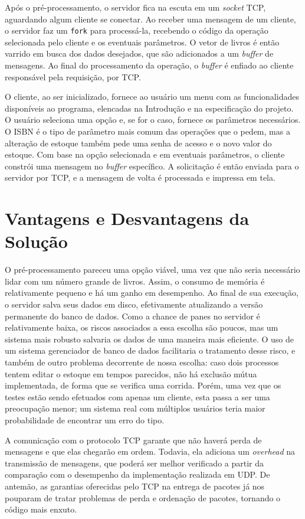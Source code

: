 \documentclass[11pt, brazil]{article} %
\begin{document}
Após o pré-processamento, o servidor fica na escuta em um \emph{socket} TCP, aguardando algum cliente se conectar. 
Ao receber uma mensagem de um cliente, o servidor faz um \texttt{fork} para processá-la, recebendo o código da operação selecionada pelo cliente e os eventuais parâmetros.
O vetor de livros é então varrido em busca dos dados desejados, que são adicionados a um \emph{buffer} de mensagens.
Ao final do processamento da operação, o \emph{buffer} é enfiado ao cliente responsável pela requisição, por TCP.

O cliente, ao ser inicializado, fornece ao usuário um menu com as funcionalidades disponíveis ao programa, elencadas na Introdução e na especificação do projeto. 
O usuário seleciona uma opção e, se for o caso, fornece os parâmetros necessários.
O ISBN é o tipo de parâmetro mais comum das operações que o pedem, mas a alteração de estoque também pede uma senha de acesso e o novo valor do estoque. 
Com base na opção selecionada e em eventuais parâmetros, o cliente constrói uma mensagem no \emph{buffer} específico. 
A solicitação é então enviada para o servidor por TCP, e a mensagem de volta é processada e impressa em tela.



\section{Vantagens e Desvantagens da Solução}

O pré-processamento pareceu uma opção viável, uma vez que não seria necessário lidar com um número grande de livros. Assim, o consumo de memória é relativamente pequeno e há um ganho em desempenho. 
Ao final de sua execução, o servidor salva seus dados em disco, efetivamente atualizando a versão permanente do banco de dados.
Como a chance de panes no servidor é relativamente baixa, os riscos associados a essa escolha são poucos, mas um sistema mais robusto salvaria os dados de uma maneira mais eficiente. 
O uso de um sistema gerenciador de banco de dados facilitaria o tratamento desse risco, e também de outro problema decorrente de nossa escolha: caso dois processos tentem editar o estoque em tempos parecidos, não há exclusão mútua implementada, de forma que se verifica uma corrida.
Porém, uma vez que os testes estão sendo efetuados com apenas um cliente, esta passa a ser uma preocupação menor; um sistema real com múltiplos usuários teria maior probabilidade de encontrar um erro do tipo.

A comunicação com o protocolo TCP garante que não haverá perda de mensagens e que elas chegarão em ordem. 
Todavia, ela adiciona um \emph{overhead} na transmissão de mensagens, que poderá ser melhor verificado a partir da comparação com o desempenho da implementação realizada em UDP. 
De antemão, as garantias oferecidas pelo TCP na entrega de pacotes já nos pouparam de tratar problemas de perda e ordenação de pacotes, tornando o código mais enxuto.
\end{document}
